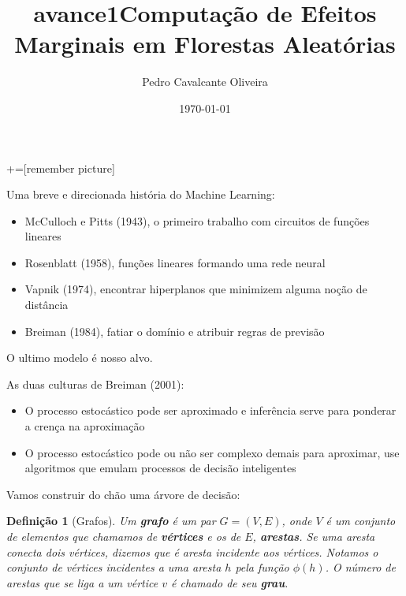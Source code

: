 \documentclass{beamer} %
\title{avance1}
\title{Computação de Efeitos Marginais em Florestas Aleatórias}
\institute[]{Universidade Federal Fluminense}
\author{Pedro Cavalcante Oliveira}
\date{\today}
\newtheorem{defi}{Definição}
\newcommand{\1}{\mathbb{I}}
\begin{document}
+=[remember picture]
\lstset{language=C++}   
\everymath{\displaystyle}

\begin{frame}

	\titlepage
\end{frame}



\begin{frame}

Uma breve e direcionada história do Machine Learning:

\begin{itemize}
    \item McCulloch e Pitts (1943), o primeiro trabalho com circuitos de funções lineares
    \item Rosenblatt (1958), funções lineares formando uma rede neural
    \item Vapnik (1974), encontrar hiperplanos que minimizem alguma noção de distância
    \item Breiman (1984), fatiar o domínio e atribuir regras de previsão
\end{itemize}

O ultimo modelo é nosso alvo.

\end{frame}


\begin{frame}

As duas culturas de Breiman (2001):

\begin{itemize}
    \item O processo estocástico pode ser aproximado e inferência serve para ponderar a crença na aproximação
    \item O processo estocástico pode ou não ser complexo demais para aproximar, use algoritmos que emulam processos de decisão inteligentes
\end{itemize}
    
\end{frame}





\begin{frame}

Vamos construir do chão uma árvore de decisão:

\begin{defi}[Grafos]
Um \textbf{grafo} é um par $G = (V, E)$, onde $V$ é um conjunto de elementos que chamamos de \textbf{vértices} e os de $E$, \textbf{arestas}. Se uma aresta conecta dois vértices, dizemos que é aresta incidente aos vértices. Notamos o conjunto de vértices incidentes a uma aresta $h$ pela função $\phi(h)$. O número de arestas que se liga a um vértice $v$ é chamado de seu \textbf{grau}.
\end{defi}

\end{frame}
\end{document}
